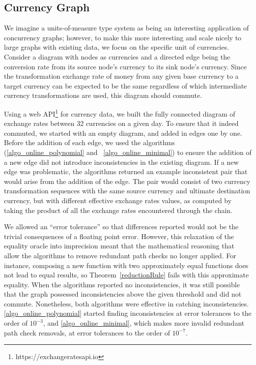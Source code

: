 \documentclass[sigplan,review,anonymous]{acmart}
\begin{document}
{\subsection{Currency Graph}
\label{sec:currency}

We imagine a units-of-measure type system as being an interesting application of concurrency graphs; however, to make this more interesting and scale nicely to large graphs with existing data, we focus on the specific unit of currencies.
Consider a diagram with nodes as currencies and a directed edge being the conversion rate from its source node's currency to its sink node's currency.
Since the transformation exchange rate of money from any given base currency to a target currency can be expected to be the same regardless of which intermediate currency transformations are used, this diagram should commute.

Using a web API\footnote{https://exchangeratesapi.io} for currency data, we built the fully connected diagram of exchange rates between 32 currencies on a given day.
To ensure that it indeed commuted, we started with an empty diagram, and added in edges one by one.
Before the addition of each edge, we used the algorithms (\ref{algo_online_polynomial} and ~\ref{algo_online_minimal})  to ensure the addition of a new edge did not introduce inconsistencies in the existing diagram.
If a new edge was problematic, the algorithms returned an example inconsistent pair that would arise from the addition of the edge.
The pair would consist of two currency transformation sequences with the same source currency and ultimate destination currency, but with different effective exchange rates values, as computed by taking the product of all the exchange rates encountered through the chain.

We allowed an ``error tolerance'' so that differences reported would not be the trivial consequences of a floating point error.
However, this relaxation of the equality oracle into imprecision meant that the mathematical reasoning that allow the algorithms to remove redundant path checks no longer applied.
For instance, composing a new function with two approximately equal functions does not lead to equal results, so Theorem~\ref{reductionRule} fails with this approximate equality.
When the algorithms reported no inconsistencies, it was still possible that the graph possessed inconsistencies above the given threshold and did not commute.
Nonetheless, both algorithms were effective in catching inconsistencies. \ref{algo_online_polynomial} started finding inconsistencies at error tolerances to the order of $10^{-3}$, and \ref{algo_online_minimal}, which makes more invalid redundant path check removals, at error tolerances to the order of $10^{-7}$.

}
\end{document}
